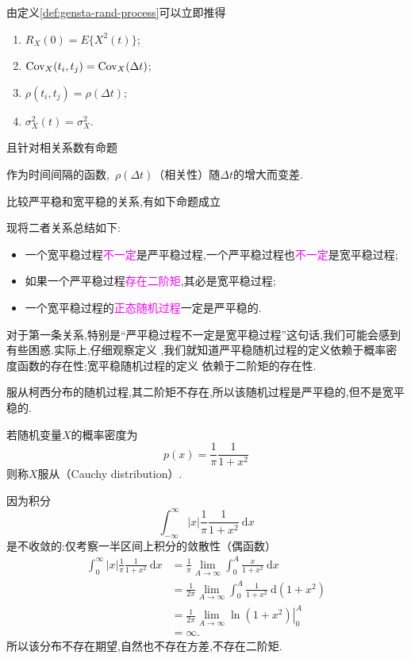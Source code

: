 \documentclass[cn,10pt,citestyle=gb7714-2015,bibstyle=gb7714-2015]{elegantbook}
\newcommand{\md}{\ \mathrm{d}}
\newcommand{\Cov}{\textup{Cov}}
\begin{document}
由定义\ref{def:gensta-rand-process}可以立即推得
\begin{enumerate}
  \item $R_X(0)=E\{X^2(t)\}$;
  \item $\Cov_X(t_i,t_j)=\Cov_X(\Delta t)$;
  \item $\rho(t_i,t_j)=\rho(\Delta t)$;
  \item $\sigma_X^2(t)=\sigma_X^2$.
\end{enumerate}
且针对相关系数有命题
\begin{proposition}\label{pro:CORR}
  作为时间间隔的函数,\ $\rho(\Delta t)$（相关性）随$\Delta t$的增大而变差.
\end{proposition}
比较严平稳和宽平稳的关系,有如下命题成立
\begin{proposition}\label{pro:str-gen-compare}
  现将二者关系总结如下:
  \begin{itemize}
    \item 一个宽平稳过程\textcolor{magenta}{不一定}是严平稳过程,一个严平稳过程也\textcolor{magenta}{不一定}是宽平稳过程;
    \item 如果一个严平稳过程\textcolor{magenta}{存在二阶矩},其必是宽平稳过程;
    \item 一个宽平稳过程的\textcolor{magenta}{正态随机过程}一定是严平稳的.
  \end{itemize}
\end{proposition}
对于第一条关系,特别是“严平稳过程不一定是宽平稳过程”这句话,我们可能会感到有些困惑.实际上,仔细观察定义
,我们就知道严平稳随机过程的定义依赖于\colorbox{yellow!20}{概率密度函数的存在性};宽平稳随机过程的定义
依赖于\colorbox{yellow!20}{二阶矩的存在性}.
\begin{example}
  服从柯西分布的随机过程,其二阶矩不存在,所以该随机过程是严平稳的,但不是宽平稳的.
\end{example}
\begin{definition}[柯西分布]\label{def:Cauchy-dist}
  若随机变量$X$的概率密度为
  \begin{equation}
    p(x)=\frac{1}{\pi}\frac{1}{1+x^2}
  \end{equation}
  则称$X$服从（\textup{Cauchy distribution}）.
\end{definition}
因为积分
\[
    \int_{-\infty}^\infty |x|\frac{1}{\pi}\frac{1}{1+x^2}\md x
\]
是不收敛的:仅考察一半区间上积分的敛散性（偶函数）
\begin{align*}
  \int_0^\infty |x|\frac{1}{\pi}\frac{1}{1+x^2}\md x&=\frac{1}{\pi}\lim_{A\to\infty}\int_0^A\frac{x}{1+x^2}\md x\\
  &=\frac{1}{2\pi}\lim_{A\to\infty}\int_0^A\frac{1}{1+x^2}\md (1+x^2)\\
  &=\frac{1}{2\pi}\lim_{A\to\infty}\left.\ln(1+x^2)\right|_0^A\\
  &=\infty.
\end{align*}
所以该分布不存在期望,自然也不存在方差,不存在二阶矩.
\end{document}
